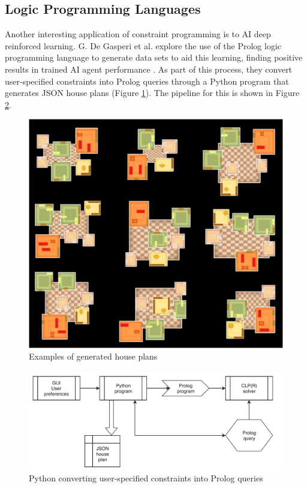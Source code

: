 \subsection{Logic Programming Languages}
Another interesting application of constraint programming is to AI deep reinforced learning. G. De Gasperi et al. explore the use of the Prolog logic programming language to generate data sets to aid this learning, finding positive results in trained AI agent performance \cite{Prolog_Deep_Learning}. As part of this process, they convert user-specified constraints into Prolog queries through a Python program that generates JSON house plans (Figure \ref{fig:housePlans}). The pipeline for this is shown in Figure \ref{fig:pythonToProlog}.

\begin{figure}[H]
    \centering
    \includegraphics[width=\textwidth, height=0.3\textheight, keepaspectratio]{Images/HousePlans.jpg}
    \caption{Examples of generated house plans \cite{Prolog_Deep_Learning}}
    \label{fig:housePlans}
\end{figure}

\begin{figure}[H]
    \centering
    \includegraphics[width=\textwidth, height=0.3\textheight, keepaspectratio]{Images/PythonToProlog.png}
    \caption{Python converting user-specified constraints into Prolog queries \cite{Prolog_Deep_Learning}}
    \label{fig:pythonToProlog}
\end{figure}

